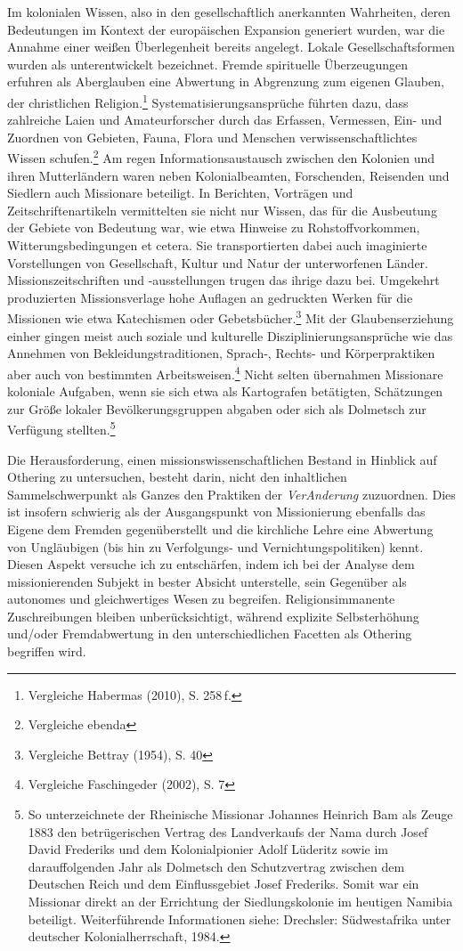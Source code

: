 \documentclass[a4paper,
fontsize=11pt,
oneside,
numbers=noperiodatend,
parskip=half-,
bibliography=totoc,
final
]{scrartcl}
\begin{document}
Im kolonialen Wissen, also in den gesellschaftlich anerkannten
Wahrheiten, deren Bedeutungen im Kontext der europäischen Expansion
generiert wurden, war die Annahme einer weißen Überlegenheit bereits
angelegt. Lokale Gesellschaftsformen wurden als unterentwickelt
bezeichnet. Fremde spirituelle Überzeugungen erfuhren als Aberglauben
eine Abwertung in Abgrenzung zum eigenen Glauben, der christlichen
Religion.\footnote{Vergleiche Habermas (2010), S. 258\,f.}
Systematisierungsansprüche führten dazu, dass zahlreiche Laien und
Amateurforscher durch das Erfassen, Vermessen, Ein- und Zuordnen von
Gebieten, Fauna, Flora und Menschen verwissenschaftlichtes Wissen
schufen.\footnote{Vergleiche ebenda} Am regen Informationsaustausch
zwischen den Kolonien und ihren Mutterländern waren neben
Kolonialbeamten, Forschenden, Reisenden und Siedlern auch Missionare
beteiligt. In Berichten, Vorträgen und Zeitschriftenartikeln
vermittelten sie nicht nur Wissen, das für die Ausbeutung der Gebiete
von Bedeutung war, wie etwa Hinweise zu Rohstoffvorkommen,
Witterungsbedingungen et cetera. Sie transportierten dabei auch
imaginierte Vorstellungen von Gesellschaft, Kultur und Natur der
unterworfenen Länder. Missionszeitschriften und -ausstellungen trugen
das ihrige dazu bei. Umgekehrt produzierten Missionsverlage hohe
Auflagen an gedruckten Werken für die Missionen wie etwa Katechismen
oder Gebetsbücher.\footnote{Vergleiche Bettray (1954), S. 40} Mit der
Glaubenserziehung einher gingen meist auch soziale und kulturelle
Disziplinierungsansprüche wie das Annehmen von Bekleidungstraditionen,
Sprach-, Rechts- und Körperpraktiken aber auch von bestimmten
Arbeitsweisen.\footnote{Vergleiche Faschingeder (2002), S. 7} Nicht
selten übernahmen Missionare koloniale Aufgaben, wenn sie sich etwa als
Kartografen betätigten, Schätzungen zur Größe lokaler
Bevölkerungsgruppen abgaben oder sich als Dolmetsch zur Verfügung
stellten.\footnote{So unterzeichnete der Rheinische Missionar Johannes
  Heinrich Bam als Zeuge 1883 den betrügerischen Vertrag des
  Landverkaufs der Nama durch Josef David Frederiks und dem
  Kolonialpionier Adolf Lüderitz sowie im darauffolgenden Jahr als
  Dolmetsch den Schutzvertrag zwischen dem Deutschen Reich und dem
  Einflussgebiet Josef Frederiks. Somit war ein Missionar direkt an der
  Errichtung der Siedlungskolonie im heutigen Namibia beteiligt.
  Weiterführende Informationen siehe: Drechsler: Südwestafrika unter
  deutscher Kolonialherrschaft, 1984.}

Die Herausforderung, einen missionswissenschaftlichen Bestand in
Hinblick auf Othering zu untersuchen, besteht darin, nicht den
inhaltlichen Sammelschwerpunkt als Ganzes den Praktiken der
\emph{VerAnderung} zuzuordnen. Dies ist insofern schwierig als der
Ausgangspunkt von Missionierung ebenfalls das Eigene dem Fremden
gegenüberstellt und die kirchliche Lehre eine Abwertung von Ungläubigen
(bis hin zu Verfolgungs- und Vernichtungspolitiken) kennt. Diesen Aspekt
versuche ich zu entschärfen, indem ich bei der Analyse dem
missionierenden Subjekt in bester Absicht unterstelle, sein Gegenüber
als autonomes und gleichwertiges Wesen zu begreifen. Religionsimmanente
Zuschreibungen bleiben unberücksichtigt, während explizite
Selbsterhöhung und/oder Fremdabwertung in den unterschiedlichen Facetten
als Othering begriffen wird.
\end{document}
